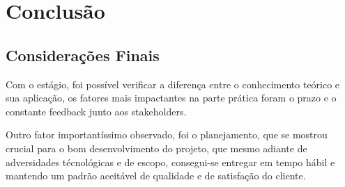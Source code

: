 \chapter[Conclusão]{Conclusão}

\section{Considerações Finais}

Com o estágio, foi possível verificar a diferença entre o conhecimento teórico e
sua aplicação, os fatores mais impactantes na parte prática foram o prazo e o constante
feedback junto aos stakeholders.

Outro fator importantíssimo observado, foi o planejamento, que se mostrou crucial
para o bom desenvolvimento do projeto, que mesmo adiante de adversidades técnológicas e de escopo,
consegui-se entregar em tempo hábil e mantendo um padrão aceitável de qualidade e de satisfação do cliente.
